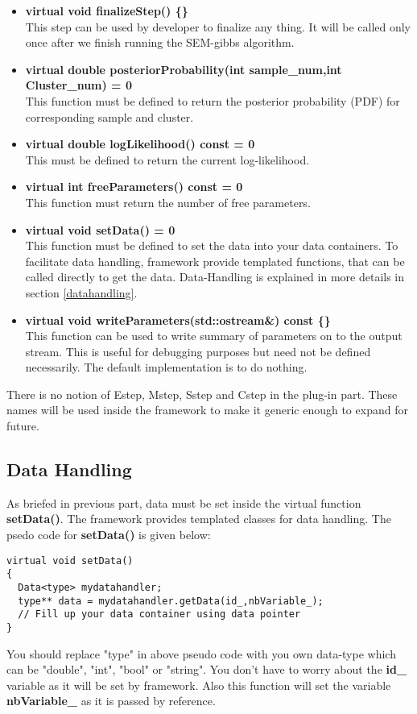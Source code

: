 \documentclass[a4paper,11pt]{article}
\begin{document}
\begin{itemize}
\item {\bf virtual void finalizeStep() \{\}}\\
This step can be used by developer to finalize any thing. It will be called only once after we
finish running the SEM-gibbs algorithm.
\item {\bf virtual double posteriorProbability(int sample\_num,int Cluster\_num) = 0}\\
This function must be defined to return the posterior probability (PDF) for corresponding sample and cluster.
\item {\bf virtual double logLikelihood() const = 0}\\
This must be defined to return the current log-likelihood.
\item {\bf virtual int freeParameters() const = 0}\\
This function must return the number of free parameters.
\item {\bf virtual void setData() = 0}\\
This function must be defined to set the data into your data containers. To facilitate data handling, framework provide templated functions,
that can be called directly to get the data. Data-Handling is explained in more details in section \ref{datahandling}.
\item {\bf virtual void writeParameters(std::ostream\&) const \{\}}\\
This function can be used to write summary of parameters on to the output stream. This is useful for debugging purposes but need not be defined necessarily. The
default implementation is to do nothing.
\end{itemize}

There is no notion of Estep, Mstep, Sstep and Cstep in the plug-in part. These names will be used inside the framework to make
it generic enough to expand for future. 

\subsection{Data Handling}
As briefed in previous part, data must be set inside the virtual function {\bf setData()}. The framework provides templated classes for data handling. The 
psedo code for {\bf setData()} is given below:
\begin{lstlisting}
virtual void setData()
{
  Data<type> mydatahandler;
  type** data = mydatahandler.getData(id_,nbVariable_);
  // Fill up your data container using data pointer
}
\end{lstlisting}
You should replace "type" in above pseudo code with you own data-type which can be {"double", "int", "bool" or "string"}. You don't have to worry about the 
{\bf id\_} variable as it will be set by framework. Also this function will set the variable {\bf nbVariable\_} as it is passed by reference.
\end{document}
